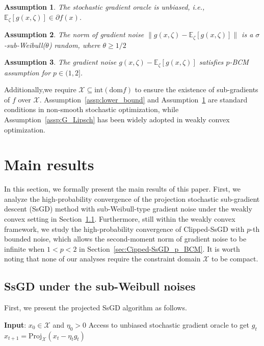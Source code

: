 \documentclass{article}
\newtheorem{assumption}{Assumption}[section]
\def \E {\mathbb{E}}
\def \X {\mathcal{X}}
\def \dom {\text{dom}}
\def \intdom {\text{int}}
\begin{document}
 \begin{assumption}\label{assp:unbiased}
     The stochastic gradient oracle is unbiased, i.e., $\E_\zeta[g(x,\zeta)]\in\partial f(x)$.
 \end{assumption}

 \begin{assumption}\label{assp:sub_weibull}
      The norm of gradient noise $\|g(x,\zeta)-\E_\zeta[g(x,\zeta)]\|$ is a $\sigma$-sub-Weibull($\theta$) random, where $\theta\geq1/2$ 
 \end{assumption}

\begin{assumption}\label{assp:p_PCM}
    The gradient noise $g(x,\zeta)-\E_\zeta[g(x,\zeta)]$ satisfies $p$-BCM assumption for $p\in(1,2]$.
\end{assumption}
Additionally,we require $\X \subseteq \intdom(\dom f)$ to ensure the existence of sub-gradients of $f$ over $\X$.
Assumption~\ref{assp:lower_bound} and Assumption~\ref{assp:unbiased} are standard conditions in non-smooth stochastic optimization, while Assumption~\ref{assp:G_Lipsch} has been widely adopted in weakly convex optimization\citep{Davis_2018,Davis2_2018,Alacaoglu_2020,li_2022,hu_2025,hong_2025}. 

\section{Main results}
In this section, we formally present the main results of this paper. First, we analyze the high-probability convergence of the projection stochastic sub-gradient descent (SsGD) method with sub-Weibull-type gradient noise under the weakly convex setting in Section~\ref{sec:SsGD_subweibull}. Furthermore, still within the weakly convex framework, we study the high-probability convergence of Clipped-SsGD with $p$-th bounded noise, which allows the second-moment norm of gradient noise to be infinite when $1 < p < 2$ in Section~\ref{sec:Cipped-SsGD_p_BCM}. It is worth noting that none of our analyses require the constraint domain $\mathcal{X}$ to be compact.
\subsection{SsGD under the sub-Weibull noises}\label{sec:SsGD_subweibull}
First, we present the projected SsGD algorithm as follows.
\begin{algorithm*}[t]
    \caption{Projected SsGD method} \label{algo:Projected_SsGD}
    \begin{algorithmic}[1]
       \STATE \textbf{Input}: $x_0 \in \X$ and $\eta_0>0$
       \STATE Access to unbiased stochastic gradient oracle to get $g_t$
       \STATE $x_{t+1} = \mathrm{Proj}_\X (x_t - \eta_t g_t)$
       \ENDFOR
    \end{algorithmic}
\end{algorithm*}
\end{document}
